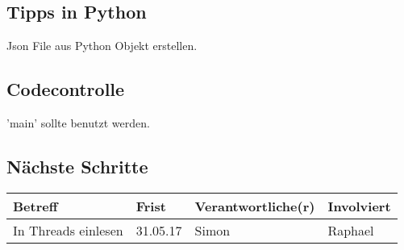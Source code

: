 \documentclass{scrartcl}
\begin{document}
\subsection{Tipps in Python}
Json File aus Python Objekt erstellen.

\subsection{Codecontrolle}
'main' sollte benutzt werden. 

\subsection{Nächste Schritte}
\begin{tabular}{L{.249} L{.2} L{.25} L{.25}}
Betreff & Frist & Verantwortliche(r) & Involviert\\\hline
In Threads einlesen & 31.05.17 & Simon & Raphael
\end{tabular}
\end{document}
